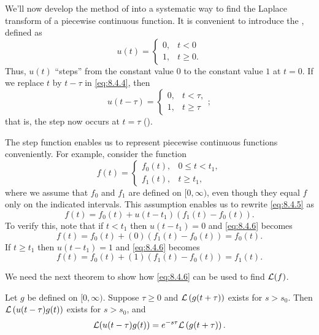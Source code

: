 
We'll now develop the method of  into a
systematic way to find the Laplace transform of a piecewise continuous
function. It is convenient to introduce the , defined as
\begin{equation}\label{eq:8.4.4}
u(t)=\begin{cases}
0,&t<0\\
1,&t\ge0.
\end{cases}
\end{equation}
Thus, $u(t)$ ``steps'' from the constant value $0$ to the constant
value $1$ at $t=0$. If we replace $t$ by
$t-\tau$ in \eqref{eq:8.4.4}, then
\[
u(t-\tau)=\begin{cases}
0,&t<\tau,\\
1,&t\ge\tau
\end{cases};
\]
that is, the step now occurs at $t=\tau$ ().






The step function enables us to represent piecewise continuous
functions conveniently. For example, consider the function
\begin{equation}\label{eq:8.4.5}
f(t)=\begin{cases}
f_0(t),&0\le t<t_1,\\
f_1(t),&t\ge t_1,
\end{cases}
\end{equation}
where we assume that $f_0$ and $f_1$ are defined on $[0,\infty)$, even
though they equal $f$ only on the indicated intervals. This assumption
enables us to rewrite \eqref{eq:8.4.5} as
\begin{equation}\label{eq:8.4.6}
f(t)=f_0(t)+u(t-t_1)\left(f_1(t)-f_0(t)\right).
\end{equation}
To verify this, note that if $t<t_1$ then $u(t-t_1)=0$ and
\eqref{eq:8.4.6}  becomes
\[
f(t)=f_0(t)+(0)\left(f_1(t)-f_0(t)\right)=f_0(t).
\]
If $t\ge t_1$ then $u(t-t_1)=1$ and  \eqref{eq:8.4.6} becomes
\[
f(t)=f_0(t)+(1)\left(f_1(t)-f_0(t)\right)=f_1(t).
\]

We need the next theorem to
 show how \eqref{eq:8.4.6} can be used to find ${\mathcal L}(f)$.

\begin{theorem}\label{thmtype:8.4.1}
Let $g$ be defined on $[0,\infty)$. Suppose   $\tau\ge0$ and
${\mathcal L}\left(g(t+\tau)\right)$ exists for $s>s_0$. Then
${\mathcal L}\left(u(t-\tau)g(t)\right)$ exists for $s>s_0$, and
\[
{\mathcal L}(u(t-\tau)g(t))=e^{-s\tau}{\mathcal L}\left(g(t+\tau)\right).
\]
\end{theorem}

